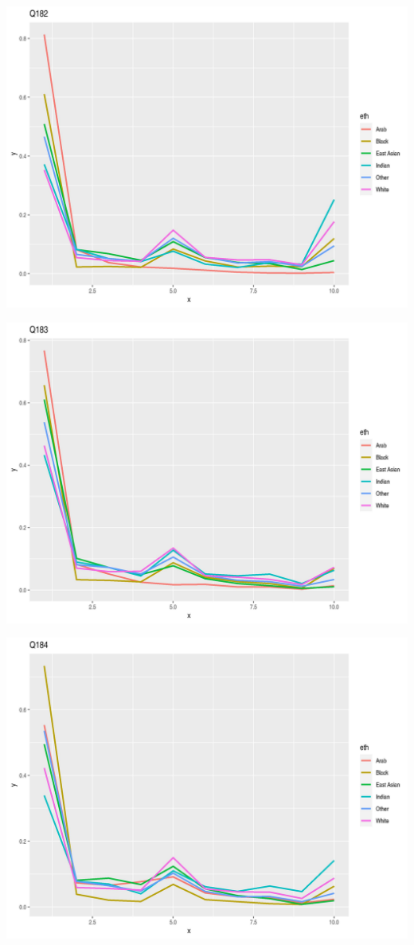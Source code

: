 \documentclass{amsart}
\begin{document}
\includegraphics[scale=0.7]{q182.jpeg}

\includegraphics[scale=0.7]{q183.jpeg}

\includegraphics[scale=0.7]{q184.jpeg}
\end{document}
